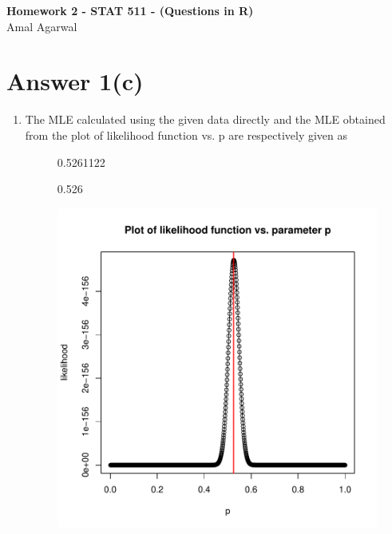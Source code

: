 \documentclass[12pt]{article}
\date{}
\newcommand{\bn}{\begin{enumerate}}
\newcommand{\en}{\end{enumerate}}
\begin{document}

\newtheorem{thm}{Theorem}[section]
\newtheorem{cor}[thm]{Corollary}
\newtheorem{lem}[thm]{Lemma}
\newtheorem{prop}[thm]{Proposition}
\newtheorem{defn}[thm]{Definition}
\newtheorem{exam}[thm]{Example}
\newtheorem{qstn}[thm]{Question}

\newpage
\begin{center}
{\bf Homework 2 - STAT 511 - (Questions in R)}\\
Amal Agarwal
\end{center}
\section*{Answer 1(c)}
\bn
\item The MLE calculated using the given data directly and the MLE obtained from the plot of likelihood function vs. p are respectively given as 
\begin{figure}[H]
\begin{Schunk}
\begin{Soutput}
[1] 0.5261122
\end{Soutput}
\begin{Soutput}
[1] 0.526
\end{Soutput}
\end{Schunk}
\includegraphics{HW2-001}
\end{figure}
\en
\end{document}
